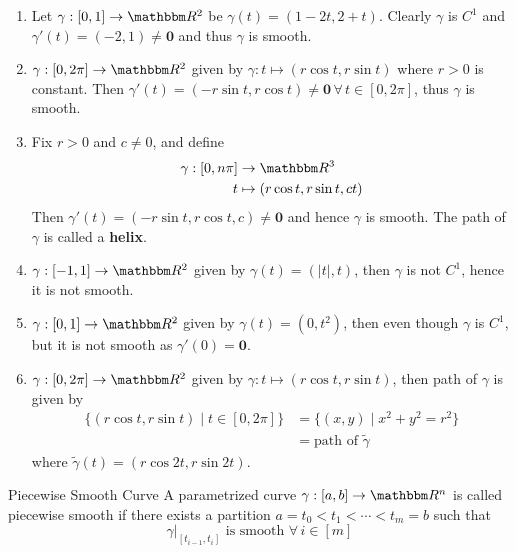 \documentclass[../Analysis-3]{subfiles}
\begin{document}
\begin{Eg}{}{}
    \begin{enumerate}
        \item Let $\gamma : [0,1] \to \R^2$ be $\gamma(t) = (1-2t,2+t)$. Clearly $\gamma$ is $C^1$ and $\gamma'(t) = (-2,1) \neq \mathbf{0}$ and thus $\gamma$ is smooth.

        \item $\gamma : [0,2\pi] \to \R^2$ given by $\gamma : t \mapsto (r \cos t, r \sin t)$ where $r > 0$ is constant. Then $\gamma'(t) = (-r\sin t, r \cos t) \neq \mathbf{0} \, \forall \, t \in [0,2\pi]$, thus $\gamma$ is smooth.

        \item Fix $r > 0$ and $c \neq 0$, and define
          \begin{align*}
              \gamma : [0, n\pi] & \to \R^3                       \\
              t                  & \mapsto (r\cos t, r\sin t, ct)
          \end{align*}
          Then $\gamma'(t) = ( -r\sin t, r \cos t, c ) \neq \mathbf{0}$ and hence $\gamma$ is smooth. The path of $\gamma$ is called a \textbf{helix}.

        \item $\gamma : [-1,1] \to \R^2$ given by $\gamma(t) = (|t|, t)$, then $\gamma$ is not $C^1$, hence it is not smooth.
        \item $\gamma : [0,1] \to \R^2$ given by $\gamma(t) = (0,t^2)$, then even though $\gamma$ is $C^1$, but it is not smooth as $\gamma'(0) = \mathbf{0}$.
        \item $\gamma : [0,2\pi] \to \R^2$ given by $\gamma : t \mapsto (r\cos t, r\sin t)$, then path of $\gamma$ is given by
          \begin{align*}
              \{ (r\cos t, r\sin t) \mid t \in [0,2\pi] \} & = \{ (x,y) \mid x^2 + y^2 = r^2\} \\
                                                           & = \mbox{path of } \tilde{\gamma}
          \end{align*}
          where $\tilde{\gamma}(t) = (r \cos 2t, r \sin 2t)$.
    \end{enumerate}
\end{Eg}

\begin{Def}{Piecewise Smooth Curve}{}
    A parametrized curve $\gamma : [a,b] \to \R^n$ is called piecewise smooth if there exists a partition $a = t_0 < t_1 < \cdots < t_m = b $ such that
    \[
        \gamma\vert_{[t_{i-1}, t_i]} \mbox{ is smooth } \forall \, i \in [m]
    \]
\end{Def}
\end{document}
